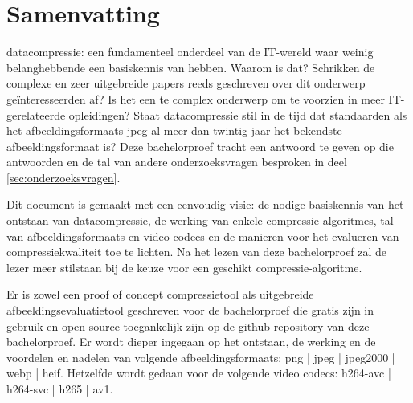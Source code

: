 
%
%


\chapter*{Samenvatting}
\label{ch:samenvatting}

\Gls{datacompressie}: een fundamenteel onderdeel van de IT-wereld waar weinig belanghebbende een basiskennis van hebben. Waarom is dat? Schrikken de complexe en zeer uitgebreide papers reeds geschreven over dit onderwerp geïnteresseerden af? Is het een te complex onderwerp om te voorzien in meer IT-gerelateerde opleidingen? Staat \gls{datacompressie} stil in de tijd dat standaarden als het \glspl{afbeeldingsformaat} \gls{jpeg} al meer dan twintig jaar het bekendste \gls{afbeeldingsformaat} is? Deze bachelorproef tracht een antwoord te geven op die antwoorden en de tal van andere onderzoeksvragen besproken in deel \ref{sec:onderzoeksvragen}. 

Dit document is gemaakt met een eenvoudig visie: de nodige basiskennis van het ontstaan van \gls{datacompressie}, de werking van enkele \glspl{compressie-algoritme}, tal van \glspl{afbeeldingsformaat} en video \glspl{codec} en de manieren voor het evalueren van compressiekwaliteit toe te lichten. Na het lezen van deze bachelorproef zal de lezer meer stilstaan bij de keuze voor een geschikt \gls{compressie-algoritme}.

Er is zowel een proof of concept \gls{compressietool} als uitgebreide \gls{afbeeldingsevaluatietool} geschreven voor de bachelorproef die gratis zijn in gebruik en \gls{open-source} toegankelijk zijn op de \gls{github} repository van deze bachelorproef. Er wordt dieper ingegaan op het ontstaan, de werking en de voordelen en nadelen van volgende \glspl{afbeeldingsformaat}: \gls{png} | \gls{jpeg} | \gls{jpeg2000} | \gls{webp} | \gls{heif}. Hetzelfde wordt gedaan voor de volgende video \glspl{codec}: \gls{h264-avc} | \gls{h264-svc} | \gls{h265} | \gls{av1}.

